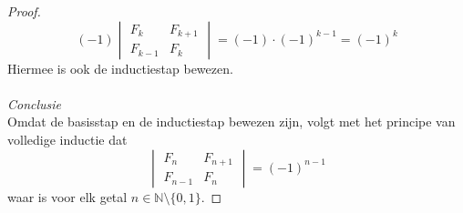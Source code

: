 \documentclass[lineaire_algebra_oplossingen.tex]{subfiles}
\begin{document}
\begin{proof}
\[
(-1)
\begin{vmatrix}
F_{k} & F_{k+1}\\
F_{k-1}   & F_{k}
\end{vmatrix}
= (-1)\cdot(-1)^{k-1}
= (-1)^{k}
\]
Hiermee is ook de inductiestap bewezen.\\\\
\emph{Conclusie}\\
Omdat de basisstap en de inductiestap bewezen zijn, volgt met het principe van volledige inductie dat
\[
\begin{vmatrix}
F_{n}   & F_{n+1}\\
F_{n-1} & F_{n}
\end{vmatrix}
=
(-1)^{n-1}
\]
waar is voor elk getal $n \in \mathbb{N}\setminus\{0,1\}$. 
\end{proof}
\end{document}
